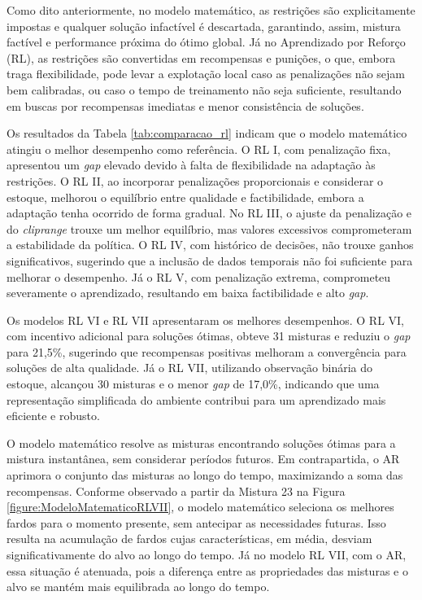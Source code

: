 \documentclass[
    12pt,                %
    openright,           %
    oneside,             %
    a4paper,             %
    english,             %
    spanish,             %
    brazil               %
]{ufscar}
\begin{document}
Como dito anteriormente, no modelo matemático, as restrições são explicitamente impostas e qualquer solução infactível é descartada, garantindo, assim, mistura factível e performance próxima do ótimo global. Já no Aprendizado por Reforço (RL), as restrições são convertidas em recompensas e punições, o que, embora traga flexibilidade, pode levar a explotação local caso as penalizações não sejam bem calibradas, ou caso o tempo de treinamento não seja suficiente, resultando em buscas por recompensas imediatas e menor consistência de soluções.

Os resultados da Tabela \ref{tab:comparacao_rl} indicam que o modelo matemático atingiu o melhor desempenho como referência. O RL I, com penalização fixa, apresentou um \textit{gap} elevado devido à falta de flexibilidade na adaptação às restrições. O RL II, ao incorporar penalizações proporcionais e considerar o estoque, melhorou o equilíbrio entre qualidade e factibilidade, embora a adaptação tenha ocorrido de forma gradual. No RL III, o ajuste da penalização e do \textit{cliprange} trouxe um melhor equilíbrio, mas valores excessivos comprometeram a estabilidade da política. O RL IV, com histórico de decisões, não trouxe ganhos significativos, sugerindo que a inclusão de dados temporais não foi suficiente para melhorar o desempenho. Já o RL V, com penalização extrema, comprometeu severamente o aprendizado, resultando em baixa factibilidade e alto \textit{gap}.

Os modelos RL VI e RL VII apresentaram os melhores desempenhos. O RL VI, com incentivo adicional para soluções ótimas, obteve 31 misturas e reduziu o \textit{gap} para 21,5\%, sugerindo que recompensas positivas melhoram a convergência para soluções de alta qualidade. Já o RL VII, utilizando observação binária do estoque, alcançou 30 misturas e o menor \textit{gap} de 17,0\%, indicando que uma representação simplificada do ambiente contribui para um aprendizado mais eficiente e robusto.

O modelo matemático resolve as misturas encontrando soluções ótimas para a mistura instantânea, sem considerar períodos futuros. Em contrapartida, o AR aprimora o conjunto das misturas ao longo do tempo, maximizando a soma das recompensas. Conforme observado a partir da Mistura 23 na Figura \ref{figure:ModeloMatematicoRLVII}, o modelo matemático seleciona os melhores fardos para o momento presente, sem antecipar as necessidades futuras. Isso resulta na acumulação de fardos cujas características, em média, desviam significativamente do alvo ao longo do tempo. Já no modelo RL VII, com o AR, essa situação é atenuada, pois a diferença entre as propriedades das misturas e o alvo se mantém mais equilibrada ao longo do tempo.
\end{document}
